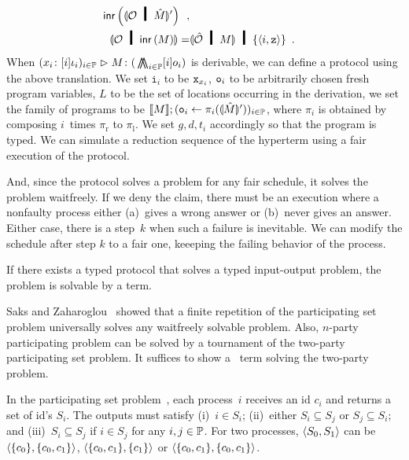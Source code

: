 {{\begin{align*}
 \linr{\semoi{\hypert\hmid\hat M}'}\enspace, \\
 \semoi{\hypert\hmid \linr{M}}=& \semoi{\hat \hypert\hmid M}\hmid
 \{\tuple{i, \p z}\}\enspace.
\end{align*} }
When $({x_i} \colon{[i]\iota_i})_{i\in\mathbb{P}}
\vartriangleright{M} \colon{(}\operatorname*{\bigwedge\kern -8pt \bigwedge}_{i\in \mathbb{P}}[i]o_i)$ is
derivable,
we can define a protocol using the above translation.
We set $\mathtt i_i$ to be ${\texttt{x}}_{x_i}$, ${\texttt{o}}_i$ to be arbitrarily
chosen fresh program variables, $L$ to be the set of locations
occurring in the derivation, we set the family of programs to be
$\llbracket{M}\rrbracket; ({\texttt{o}}_i\leftarrow \pi_i(\llparenthesis{\hat M}\rrparenthesis'))_{i\in\mathbb{P}}$,
where $\pi_i$ is obtained by composing $i$~times $\pi_{\mathrm r}$ to
$\pi_{\mathrm l}$.
We set $g,d,t_i$ accordingly so that the program is typed.
We can simulate a reduction sequence of
the hyperterm using a fair execution of the protocol.


And, since the protocol solves a problem for any fair schedule, it
solves the problem waitfreely.
If we deny the claim, there must be an execution where a nonfaulty
process
either (a)~gives a
wrong answer or
 (b)~never gives an answer.
 Either case, there is a step~$k$ when
 such a failure is inevitable.
We can modify the schedule after step $k$ to a fair one,
keeeping the failing behavior of
the process.

\begin{theorem}[Completeness]
If there exists a typed protocol that solves a typed input-output
 problem,
the problem is solvable by a term.
\end{theorem}

Saks and Zaharoglou~\cite{Saks:1993vq} showed that a finite repetition of the participating set
problem universally solves any waitfreely solvable problem.
Also, $n$-party participating problem can be solved by a tournament of
the two-party participating set problem.
It suffices to show a \lgd\, term solving the two-party problem.


In the participating set problem~\cite{borowsky},
each process~$i$ receives an id $c_i$ and
returns a set of id's $S_i$.
The outputs must satisfy (i)~$i\in S_i$; (ii)~either $S_i\subseteq S_j$
or $S_j\subseteq S_i$; and (iii)~$S_i\subseteq S_j$  if $i\in S_j$ for any
$i,j\in\mathbb{P}$.
For two processes,
$\langle{S_0, S_1}\rangle$ can be $\langle{\{c_0\}, \{c_0, c_1\}}\rangle$, $\langle{\{c_0, c_1\}, \{c_1\}}\rangle$
or
$\langle{\{c_0, c_1\}, \{c_0, c_1\}}\rangle$.

}
